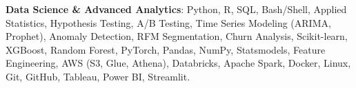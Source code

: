 \item \textbf{Data Science \& Advanced Analytics}: Python, R, SQL, Bash/Shell, Applied Statistics, Hypothesis Testing, A/B Testing, Time Series Modeling (ARIMA, Prophet), Anomaly Detection, RFM Segmentation, Churn Analysis, Scikit-learn, XGBoost, Random Forest, PyTorch, Pandas, NumPy, Statsmodels, Feature Engineering, AWS (S3, Glue, Athena), Databricks, Apache Spark, Docker, Linux, Git, GitHub, Tableau, Power BI, Streamlit.


